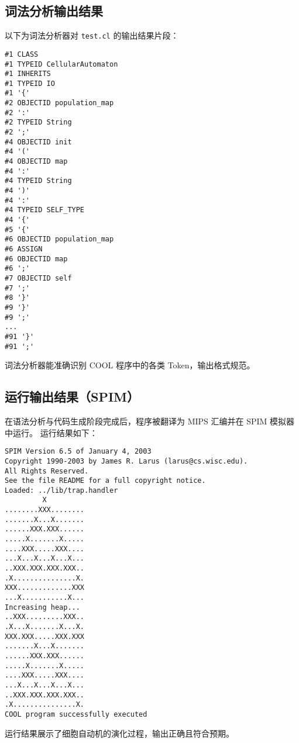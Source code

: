 \documentclass[a4paper,12pt]{article}
\begin{document}
\subsection{词法分析输出结果}
以下为词法分析器对 \texttt{test.cl} 的输出结果片段：
\begin{lstlisting}[basicstyle=\ttfamily\scriptsize]
#1 CLASS
#1 TYPEID CellularAutomaton
#1 INHERITS
#1 TYPEID IO
#1 '{'
#2 OBJECTID population_map
#2 ':'
#2 TYPEID String
#2 ';'
#4 OBJECTID init
#4 '('
#4 OBJECTID map
#4 ':'
#4 TYPEID String
#4 ')'
#4 ':'
#4 TYPEID SELF_TYPE
#4 '{'
#5 '{'
#6 OBJECTID population_map
#6 ASSIGN
#6 OBJECTID map
#6 ';'
#7 OBJECTID self
#7 ';'
#8 '}'
#9 '}'
#9 ';'
...
#91 '}'
#91 ';'
\end{lstlisting}

词法分析器能准确识别 COOL 程序中的各类 Token，输出格式规范。

\subsection{运行输出结果（SPIM）}
在语法分析与代码生成阶段完成后，程序被翻译为 MIPS 汇编并在 SPIM 模拟器中运行。
运行结果如下：

\begin{lstlisting}[basicstyle=\ttfamily\small]
SPIM Version 6.5 of January 4, 2003
Copyright 1990-2003 by James R. Larus (larus@cs.wisc.edu).
All Rights Reserved.
See the file README for a full copyright notice.
Loaded: ../lib/trap.handler
         X         
........XXX........
.......X...X.......
......XXX.XXX......
.....X.......X.....
....XXX.....XXX....
...X...X...X...X...
..XXX.XXX.XXX.XXX..
.X...............X.
XXX.............XXX
...X...........X...
Increasing heap...
..XXX.........XXX..
.X...X.......X...X.
XXX.XXX.....XXX.XXX
.......X...X.......
......XXX.XXX......
.....X.......X.....
....XXX.....XXX....
...X...X...X...X...
..XXX.XXX.XXX.XXX..
.X...............X.
COOL program successfully executed
\end{lstlisting}

运行结果展示了细胞自动机的演化过程，输出正确且符合预期。
\newpage
\end{document}
